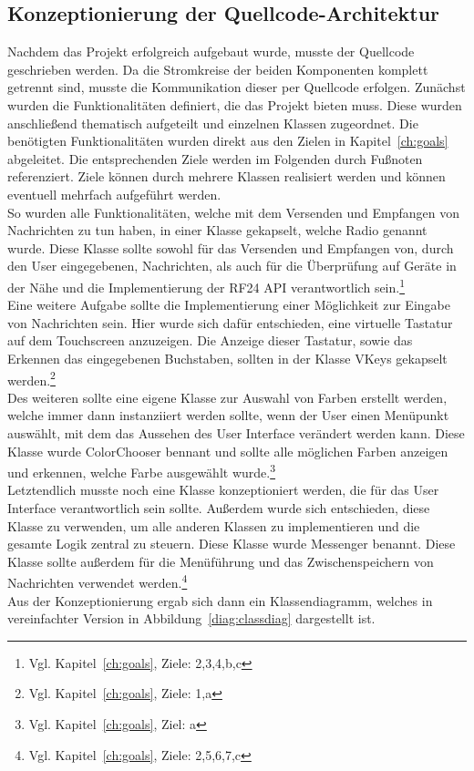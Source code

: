 \documentclass[a4paper, 11pt]{scrartcl}
\begin{document}
\subsection{Konzeptionierung der Quellcode-Architektur}
Nachdem das Projekt erfolgreich aufgebaut wurde, musste der Quellcode geschrieben werden. Da die Stromkreise der beiden Komponenten komplett getrennt sind,
musste die Kommunikation dieser per Quellcode erfolgen.
Zunächst wurden die Funktionalitäten definiert, die das Projekt bieten muss. Diese wurden anschließend thematisch aufgeteilt und einzelnen Klassen zugeordnet.
Die benötigten Funktionalitäten wurden direkt aus den Zielen in Kapitel~\ref{ch:goals} abgeleitet. Die entsprechenden Ziele werden im Folgenden durch Fußnoten
referenziert. Ziele können durch mehrere Klassen realisiert werden und können eventuell mehrfach aufgeführt werden.
\\
So wurden alle Funktionalitäten, welche mit dem Versenden und Empfangen von Nachrichten zu tun haben, in einer Klasse gekapselt, welche \glqq Radio\grqq{} genannt wurde.
Diese Klasse sollte sowohl für das Versenden und Empfangen von, durch den User eingegebenen, Nachrichten, als auch für die Überprüfung auf Geräte in der Nähe und die
Implementierung der RF24 API verantwortlich sein.\footnote{Vgl. Kapitel~\ref{ch:goals}, Ziele: 2,3,4,b,c}
\\
Eine weitere Aufgabe sollte die Implementierung einer Möglichkeit zur Eingabe von Nachrichten sein. Hier wurde sich dafür entschieden, eine virtuelle Tastatur auf dem
Touchscreen anzuzeigen. Die Anzeige dieser Tastatur, sowie das Erkennen das eingegebenen Buchstaben, sollten in der Klasse \glqq VKeys\grqq{} gekapselt 
werden.\footnote{Vgl. Kapitel~\ref{ch:goals}, Ziele: 1,a}
\\
Des weiteren sollte eine eigene Klasse zur Auswahl von Farben erstellt werden, welche immer dann instanziiert werden sollte, wenn der User einen Menüpunkt auswählt,
mit dem das Aussehen des User Interface verändert werden kann. Diese Klasse wurde \glqq ColorChooser\grqq{} bennant und sollte alle möglichen Farben anzeigen 
und erkennen, welche Farbe ausgewählt wurde.\footnote{Vgl. Kapitel~\ref{ch:goals}, Ziel: a}
\\
Letztendlich musste noch eine Klasse konzeptioniert werden, die für das User Interface verantwortlich sein sollte. Außerdem wurde sich entschieden, diese Klasse
zu verwenden, um alle anderen Klassen zu implementieren und die gesamte Logik zentral zu steuern. Diese Klasse wurde \glqq Messenger\grqq{} benannt. Diese Klasse
sollte außerdem für die Menüführung und das Zwischenspeichern von Nachrichten verwendet werden.\footnote{Vgl. Kapitel~\ref{ch:goals}, Ziele: 2,5,6,7,c}
\\
Aus der Konzeptionierung ergab sich dann ein Klassendiagramm, welches in vereinfachter Version in Abbildung~\ref{diag:classdiag} dargestellt ist.
\end{document}
